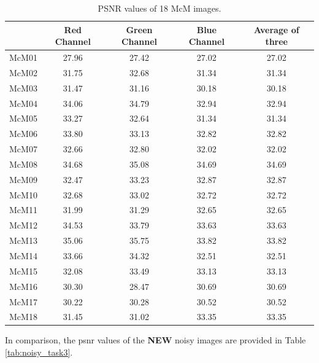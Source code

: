 \documentclass[a4paper,11pt]{article}
\begin{document}
\begin{table}[h]
\centering
\caption{PSNR values of 18 McM images.}
\label{tab:result_task3}
\begin{tabular}{|c|c|c|c|c|}
\hline
 & Red Channel & Green Channel & Blue Channel & Average of three \\ \hline
McM01 & 27.96 & 27.42 & 27.02 & 27.02 \\ \hline
McM02 & 31.75 & 32.68 & 31.34 & 31.34 \\ \hline
McM03 & 31.47 & 31.16 & 30.18 & 30.18 \\ \hline
McM04 & 34.06 & 34.79 & 32.94 & 32.94 \\ \hline
McM05 & 33.27 & 32.64 & 31.34 & 31.34 \\ \hline
McM06 & 33.80 & 33.13 & 32.82 & 32.82 \\ \hline
McM07 & 32.66 & 32.80 & 32.02 & 32.02 \\ \hline
McM08 & 34.68 & 35.08 & 34.69 & 34.69 \\ \hline
McM09 & 32.47 & 33.23 & 32.87 & 32.87 \\ \hline
McM10 & 32.68 & 33.02 & 32.72 & 32.72 \\ \hline
McM11 & 31.99 & 31.29 & 32.65 & 32.65 \\ \hline
McM12 & 34.53 & 33.79 & 33.63 & 33.63 \\ \hline
McM13 & 35.06 & 35.75 & 33.82 & 33.82 \\ \hline
McM14 & 33.66 & 34.32 & 32.51 & 32.51 \\ \hline
McM15 & 32.08 & 33.49 & 33.13 & 33.13 \\ \hline
McM16 & 30.30 & 28.47 & 30.69 & 30.69 \\ \hline
McM17 & 30.22 & 30.28 & 30.52 & 30.52 \\ \hline
McM18 & 31.45 & 31.02 & 33.35 & 33.35 \\ \hline
\end{tabular}
%
\end{table}



In comparison, the psnr values of the {\bf NEW} noisy images are provided in Table \ref{tab:noisy_task3}. 
\end{document}
